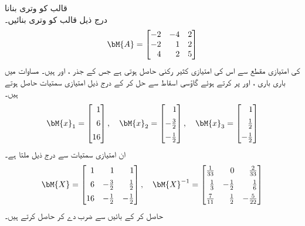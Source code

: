 \quad قالب کو وتری بنانا\\
درج ذیل قالب کو وتری بنائیں۔
\begin{align*}
\bM{A}=\begin{bmatrix*}[r]-2&-4&2\\-2&1&2\\4&2&5  \end{bmatrix*}
\end{align*}
 کی امتیازی مقطع سے اس کی امتیازی کثیر رکنی  حاصل ہوتی ہے جس کے جذر ،  اور  ہیں۔ مساوات  میں باری باری ،  اور  پر کرتے ہوئے گاؤسی اسقاط سے حل کر کے درج ذیل امتیازی سمتیات حاصل ہوتے ہیں۔
\begin{align*}
\bM{x}_1=\begin{bmatrix*}[r]1 \\[0.5em] 6 \\[0.5em] 16  \end{bmatrix*}, \quad \bM{x}_2=\begin{bmatrix*}[r]1 \\[0.5em] -\tfrac{3}{2} \\[0.5em] -\tfrac{1}{2}  \end{bmatrix*},\quad \bM{x}_3=\begin{bmatrix*}[r]1 \\[0.5em] \tfrac{1}{2} \\[0.5em]-\tfrac{1}{2}  \end{bmatrix*}
\end{align*}
ان امتیازی سمتیات سے درج ذیل ملتا ہے۔
\begin{align*}
\bM{X}=\begin{bmatrix*}[r] 1&1&1\\[0.5em] 6&-\tfrac{3}{2}&\tfrac{1}{2}\\[0.5em] 16&-\tfrac{1}{2}& -\tfrac{1}{2} \end{bmatrix*}, \quad 
\bM{X}^{-1}=\begin{bmatrix*}[r] \tfrac{1}{33}&0&\tfrac{2}{33}\\[0.5em]\tfrac{1}{3}&-\tfrac{1}{2}&\tfrac{1}{6}\\[0.5em]
\tfrac{7}{11}&\tfrac{1}{2}&-\tfrac{5}{22}\end{bmatrix*}
\end{align*}
 حاصل کر کے بائیں  سے ضرب دے کر  حاصل کرتے ہیں۔
